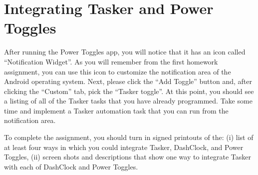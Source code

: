\section*{Integrating Tasker and Power Toggles}

After running the Power Toggles app, you will notice that it has an icon called ``Notification Widget''.  As you will
remember from the first homework assignment, you can use this icon to customize the notification area of the Android
operating system.  Next, please click the ``Add Toggle'' button and, after clicking the ``Custom'' tab, pick the
``Tasker toggle''.  At this point, you should see a listing of all of the Tasker tasks that you have already programmed.
Take some time and implement a Tasker automation task that you can run from the notification area.


To complete the assignment, you should turn in signed printouts of the: (i) list of at least four ways in which you
could integrate Tasker, DashClock, and Power Toggles, (ii) screen shots and descriptions that show one way to integrate
Tasker with each of DashClock and Power Toggles.


